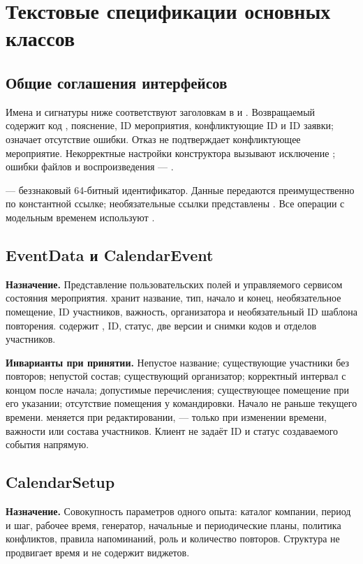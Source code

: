 \section{Текстовые спецификации основных классов}
\subsection{Общие соглашения интерфейсов}
Имена и сигнатуры ниже соответствуют заголовкам в  и . Возвращаемый  содержит код , пояснение, ID мероприятия, конфликтующие ID и ID заявки;  означает отсутствие ошибки. Отказ не подтверждает конфликтующее мероприятие. Некорректные настройки конструктора вызывают исключение ; ошибки файлов и воспроизведения --- .

 --- беззнаковый 64-битный идентификатор. Данные передаются преимущественно по константной ссылке; необязательные ссылки представлены . Все операции с модельным временем используют .

\subsection{EventData и CalendarEvent}
\textbf{Назначение.} Представление пользовательских полей и управляемого сервисом состояния мероприятия.  хранит название, тип, начало и конец, необязательное помещение, ID участников, важность, организатора и необязательный ID шаблона повторения.  содержит , ID, статус, две версии и снимки кодов и отделов участников.

\textbf{Инварианты при принятии.} Непустое название; существующие участники без повторов; непустой состав; существующий организатор; корректный интервал с концом после начала; допустимые перечисления; существующее помещение при его указании; отсутствие помещения у командировки. Начало не раньше текущего времени.  меняется при редактировании,  --- только при изменении времени, важности или состава участников. Клиент не задаёт ID и статус создаваемого события напрямую.

\subsection{CalendarSetup}
\textbf{Назначение.} Совокупность параметров одного опыта: каталог компании, период и шаг, рабочее время, генератор, начальные и периодические планы, политика конфликтов, правила напоминаний, роль и количество повторов. Структура не продвигает время и не содержит виджетов.

